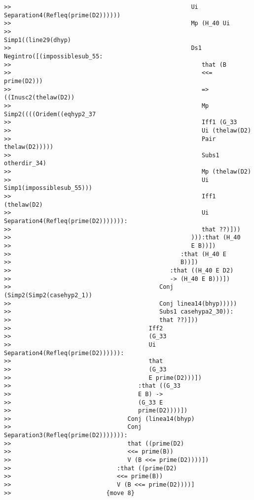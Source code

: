 \documentclass[12pt]{article}
\begin{document}
\begin{verbatim}
>>                                                   Ui Separation4(Refleq(prime(D2))))))
>>                                                   Mp (H_40 Ui
>>                                                   Simp1((line29(dhyp)
>>                                                   Ds1 Negintro([(impossiblesub_55:
>>                                                      that (B
>>                                                      <<= prime(D2)))
>>                                                      => ((Inusc2(thelaw(D2))
>>                                                      Mp Simp2((((Oridem((eqhyp2_37
>>                                                      Iff1 (G_33
>>                                                      Ui (thelaw(D2)
>>                                                      Pair thelaw(D2)))))
>>                                                      Subs1 otherdir_34)
>>                                                      Mp (thelaw(D2)
>>                                                      Ui Simp1(impossiblesub_55)))
>>                                                      Iff1 (thelaw(D2)
>>                                                      Ui Separation4(Refleq(prime(D2))))))):
>>                                                      that ??)]))
>>                                                   ))):that (H_40
>>                                                   E B))])
>>                                                :that (H_40 E
>>                                                B))])
>>                                             :that ((H_40 E D2)
>>                                             -> (H_40 E B)))])
>>                                          Conj (Simp2(Simp2(casehyp2_1))
>>                                          Conj linea14(bhyp)))))
>>                                          Subs1 casehypa2_30)):
>>                                          that ??)]))
>>                                       Iff2
>>                                       (G_33
>>                                       Ui Separation4(Refleq(prime(D2)))))):
>>                                       that
>>                                       (G_33
>>                                       E prime(D2)))])
>>                                    :that ((G_33
>>                                    E B) ->
>>                                    (G_33 E
>>                                    prime(D2))))])
>>                                 Conj (linea14(bhyp)
>>                                 Conj Separation3(Refleq(prime(D2))))))):
>>                                 that ((prime(D2)
>>                                 <<= prime(B))
>>                                 V (B <<= prime(D2))))])
>>                              :that ((prime(D2)
>>                              <<= prime(B))
>>                              V (B <<= prime(D2))))]
>>                           {move 8}




\end{verbatim}
\end{document}

